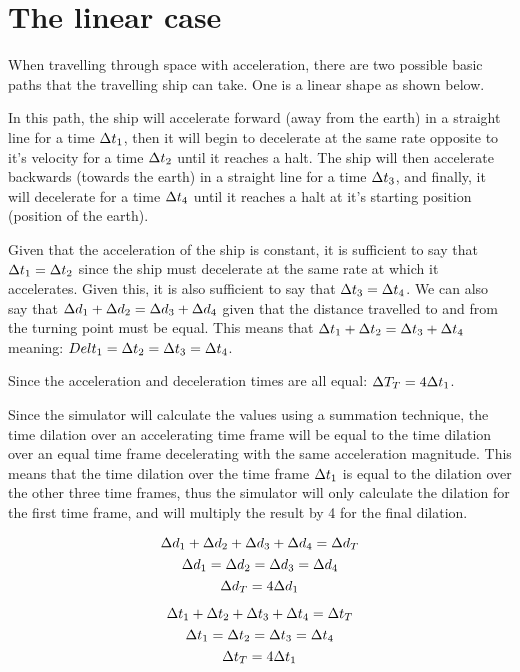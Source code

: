 \section{The linear case}
	When travelling through space with acceleration, there are two possible basic paths that the travelling ship
	can take. One is a linear shape as shown below.
	
	In this path, the ship will accelerate forward (away from the earth) in a straight line for a time $\mathrm{\Delta} t_1$, then it will begin 
	to decelerate at the same rate opposite to it's velocity for a time $\mathrm{\Delta} t_2$ until it reaches a halt. The ship will then 
	accelerate backwards (towards the earth) in a straight line for a time $\mathrm{\Delta} t_3$, and finally, it will decelerate for a time
	$\mathrm{\Delta} t_4$ until it reaches a halt at it's starting position (position of the earth).

	Given that the acceleration of the ship is constant, it is sufficient to say that $\mathrm{\Delta} t_1 = \mathrm{\Delta} t_2$ since the 
	ship must decelerate at the same rate at which it accelerates. Given this, it is also sufficient to say that $\mathrm{\Delta} t_3 = \mathrm{\Delta} t_4$.
	We can also say that $\mathrm{\Delta} d_1 + \mathrm{\Delta} d_2 = \mathrm{\Delta} d_3 + \mathrm{\Delta} d_4$ given that the distance travelled to and from the turning point
	must be equal. This means that $\mathrm{\Delta} t_1 + \mathrm{\Delta} t_2 = \mathrm{\Delta} t_3 + \mathrm{\Delta} t_4$ meaning: $Del t_1 = \mathrm{\Delta} t_2 = \mathrm{\Delta} t_3 = \mathrm{\Delta} t_4$.

	Since the acceleration and deceleration times are all equal: $\mathrm{\Delta} T_T = 4\mathrm{\Delta} t_1$.

	Since the simulator will calculate the values using a summation technique, the time dilation over an accelerating time frame will be 
	equal to the time dilation over an equal time frame decelerating with the same acceleration magnitude. This means that the time dilation
	over the time frame $\mathrm{\Delta} t_1$ is equal to the dilation over the other three time frames, thus the simulator will only calculate
	the dilation for the first time frame, and will multiply the result by 4 for the final dilation.
	\begin{samepagecols}{2}
		\[\mathrm{\Delta} d_1 + \mathrm{\Delta} d_2 + \mathrm{\Delta} d_3 + \mathrm{\Delta} d_4 = \mathrm{\Delta} d_T\]
		\[\mathrm{\Delta} d_1 = \mathrm{\Delta} d_2 = \mathrm{\Delta} d_3 = \mathrm{\Delta} d_4\]
		\[\mathrm{\Delta} d_T = 4\mathrm{\Delta} d_1\]

		\columnbreak

		\[\mathrm{\Delta} t_1 + \mathrm{\Delta} t_2 + \mathrm{\Delta} t_3 + \mathrm{\Delta} t_4 = \mathrm{\Delta} t_T\]
		\[\mathrm{\Delta} t_1 = \mathrm{\Delta} t_2 = \mathrm{\Delta} t_3 = \mathrm{\Delta} t_4\]
		\[\mathrm{\Delta} t_T = 4\mathrm{\Delta} t_1\]
	\end{samepagecols}
